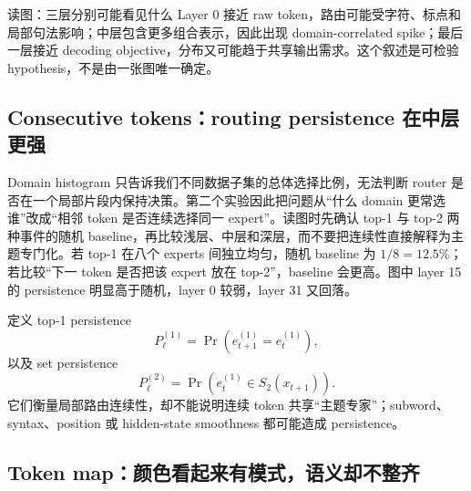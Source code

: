 
\begin{knowledgebox}{读图：三层分别可能看见什么}
Layer 0 接近 raw token，路由可能受字符、标点和局部句法影响；中层包含更多组合表示，因此出现 domain-correlated spike；最后一层接近 decoding objective，分布又可能趋于共享输出需求。这个叙述是可检验 hypothesis，不是由一张图唯一确定。
\end{knowledgebox}


\subsection{Consecutive tokens：routing persistence 在中层更强}

Domain histogram 只告诉我们不同数据子集的总体选择比例，无法判断 router 是否在一个局部片段内保持决策。第二个实验因此把问题从“什么 domain 更常选谁”改成“相邻 token 是否连续选择同一 expert”。读图时先确认 top-1 与 top-2 两种事件的随机 baseline，再比较浅层、中层和深层，而不要把连续性直接解释为主题专门化。若 top-1 在八个 experts 间独立均匀，随机 baseline 为 $1/8=12.5\%$；若比较“下一 token 是否把该 expert 放在 top-2”，baseline 会更高。图中 layer 15 的 persistence 明显高于随机，layer 0 较弱，layer 31 又回落。


定义 top-1 persistence
\[
P_{\ell}^{(1)}=\Pr\!\left(e_{t+1}^{(1)}=e_t^{(1)}\right),
\]
以及 set persistence
\[
P_{\ell}^{(2)}=\Pr\!\left(e_t^{(1)}\in S_2(x_{t+1})\right).
\]
它们衡量局部路由连续性，却不能说明连续 token 共享“主题专家”；subword、syntax、position 或 hidden-state smoothness 都可能造成 persistence。


\subsection{Token map：颜色看起来有模式，语义却不整齐}

